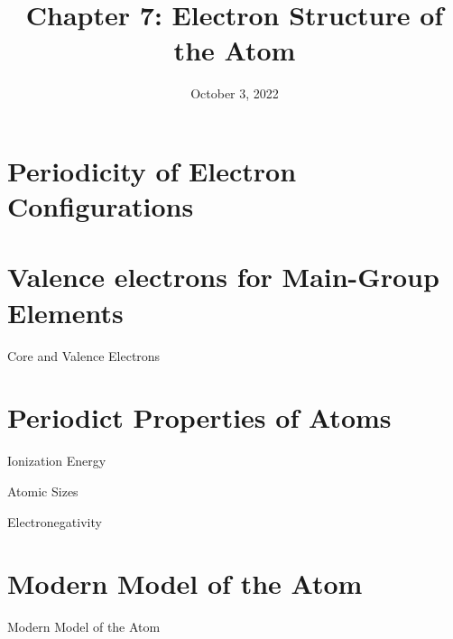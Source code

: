 \documentclass[11pt]{beamer}
\title{Chapter 7: Electron Structure of the Atom}
\institute{Chemistry Department, Cypress College}
\date{October 3, 2022}
\begin{document}
\begin{frame}
  \titlepage
\end{frame}

\section{}

\section{Periodicity of Electron Configurations}

\begin{frame}{}
\end{frame}

\section{Valence electrons for Main-Group Elements}

\begin{frame}{Core and Valence Electrons}
\end{frame}

\section{Periodict Properties of Atoms}

\begin{frame}{Ionization Energy}
\end{frame}

\begin{frame}{Atomic Sizes}
\end{frame}

\begin{frame}{Electronegativity}
\end{frame}


\section{Modern Model of the Atom}

\begin{frame}{Modern Model of the Atom}
\end{frame}
\end{document}
